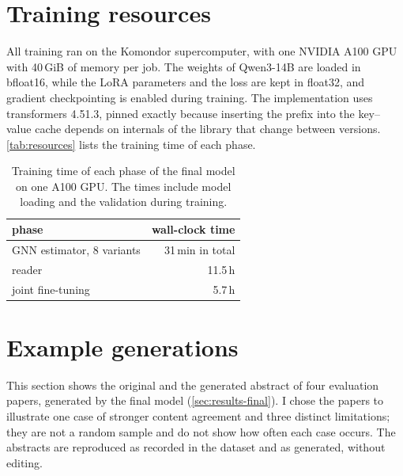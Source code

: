 \section{Training resources}
\label{app:resources}

All training ran on the Komondor supercomputer, with one NVIDIA A100 GPU with 40\,GiB of memory per job. The weights of Qwen3-14B are loaded in bfloat16, while the LoRA parameters and the loss are kept in float32, and gradient checkpointing is enabled during training. The implementation uses transformers 4.51.3, pinned exactly because inserting the prefix into the key--value cache depends on internals of the library that change between versions. \autoref{tab:resources} lists the training time of each phase.

\begin{table}[!ht]
  \centering
  \begin{tabular}{@{}lr@{}}
    \toprule
    phase & wall-clock time \\
    \midrule
    GNN estimator, 8 variants & 31\,min in total \\
    reader & 11.5\,h \\
    joint fine-tuning & 5.7\,h \\
    \bottomrule
  \end{tabular}
  \caption{Training time of each phase of the final model on one A100 GPU. The times include model loading and the validation during training.}
  \label{tab:resources}
\end{table}

\section{Example generations}
\label{app:examples}

This section shows the original and the generated abstract of four evaluation papers, generated by the final model (\autoref{sec:results-final}). I chose the papers to illustrate one case of stronger content agreement and three distinct limitations; they are not a random sample and do not show how often each case occurs. The abstracts are reproduced as recorded in the dataset and as generated, without editing.

